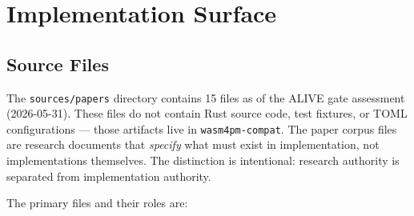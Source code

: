 
\section{Implementation Surface}
\label{sec:sources-papers-impl}

\subsection{Source Files}
\label{sec:sources-papers-impl-files}

The \texttt{sources/papers} directory contains 15 files as of the ALIVE gate
assessment (2026-05-31). These files do not contain Rust source code, test
fixtures, or TOML configurations --- those artifacts live in
\texttt{wasm4pm-compat}. The paper corpus files are research documents that
\emph{specify} what must exist in implementation, not implementations
themselves. The distinction is intentional: research authority is separated
from implementation authority.

The primary files and their roles are:

